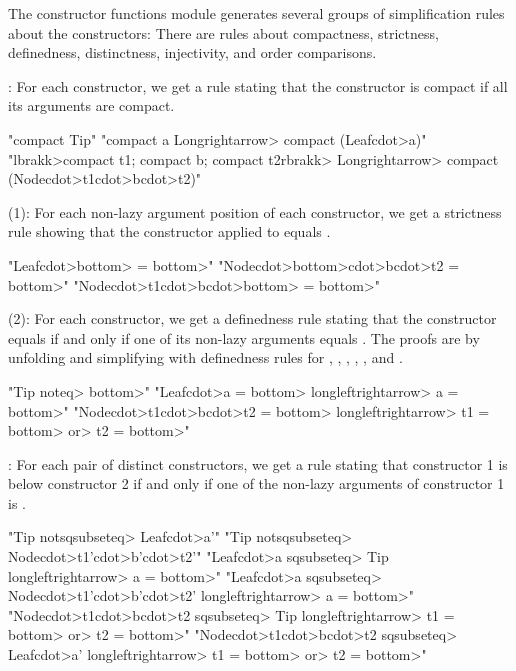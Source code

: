 The constructor functions module generates several groups of simplification rules about the constructors: There are rules about compactness, strictness, definedness, distinctness, injectivity, and order comparisons.

\begin{itemize*}
\item {}: For each constructor, we get a rule stating that the constructor is compact if all its arguments are compact.
%
\begin{isacode}
"compact Tip"
"compact a \<Longrightarrow> compact (Leaf\<cdot>a)"
"\<lbrakk>compact t1; compact b; compact t2\<rbrakk> \<Longrightarrow> compact (Node\<cdot>t1\<cdot>b\<cdot>t2)"
\end{isacode}

\item {} (1): For each non-lazy argument position of each constructor, we get a strictness rule showing that the constructor applied to  equals .
%
\begin{isacode}
"Leaf\<cdot>\<bottom> = \<bottom>"
"Node\<cdot>\<bottom>\<cdot>b\<cdot>t2 = \<bottom>"
"Node\<cdot>t1\<cdot>b\<cdot>\<bottom> = \<bottom>"
\end{isacode}

\item {} (2): For each constructor, we get a definedness rule stating that the constructor equals  if and only if one of its non-lazy arguments equals . The proofs are by unfolding  and simplifying with definedness rules for , , , , , and .
%
\begin{isacode}
"Tip \<noteq> \<bottom>"
"Leaf\<cdot>a = \<bottom> \<longleftrightarrow> a = \<bottom>"
"Node\<cdot>t1\<cdot>b\<cdot>t2 = \<bottom> \<longleftrightarrow> t1 = \<bottom> \<or> t2 = \<bottom>"
\end{isacode}

\item {}: For each pair of distinct constructors, we get a rule stating that constructor 1 is below constructor 2 if and only if one of the non-lazy arguments of constructor 1 is .
%
\begin{isacode}
"Tip \<notsqsubseteq> Leaf\<cdot>a'"
"Tip \<notsqsubseteq> Node\<cdot>t1'\<cdot>b'\<cdot>t2'"
"Leaf\<cdot>a \<sqsubseteq> Tip \<longleftrightarrow> a = \<bottom>"
"Leaf\<cdot>a \<sqsubseteq> Node\<cdot>t1'\<cdot>b'\<cdot>t2' \<longleftrightarrow> a = \<bottom>"
"Node\<cdot>t1\<cdot>b\<cdot>t2 \<sqsubseteq> Tip \<longleftrightarrow> t1 = \<bottom> \<or> t2 = \<bottom>"
"Node\<cdot>t1\<cdot>b\<cdot>t2 \<sqsubseteq> Leaf\<cdot>a' \<longleftrightarrow> t1 = \<bottom> \<or> t2 = \<bottom>"
\end{isacode}


\end{itemize*}
